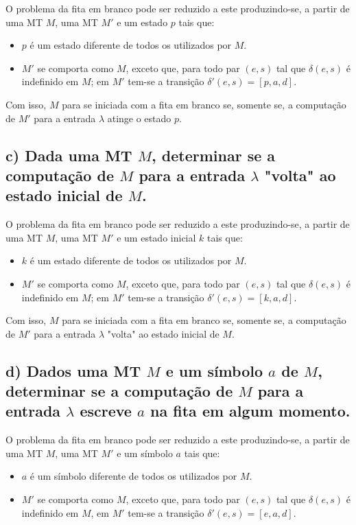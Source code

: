O problema da fita em branco pode ser reduzido a este produzindo-se, a partir de uma MT $M$, uma MT $M'$ e um estado $p$ tais que:

\begin{itemize}
    \item $p$ é um estado diferente de todos os utilizados por $M$.
    \item $M'$ se comporta como $M$, exceto que, para todo par $(e,s)$ tal que $\delta{(e,s)}$ é indefinido em $M$; em $M'$ tem-se a transição $\delta'{(e,s)} = [p,a,d]$. 
\end{itemize}

Com isso, $M$ para se iniciada com a fita em branco se, somente se, a computação de $M'$ para a entrada $\lambda$ atinge o estado $p$.

\subsection*{c) Dada uma MT $M$, determinar se a computação de $M$ para a entrada $\lambda$ "volta" ao estado inicial de $M$.}

O problema da fita em branco pode ser reduzido a este produzindo-se, a partir de uma MT $M$, uma MT $M'$ e um estado inicial $k$ tais que:

\begin{itemize}
    \item $k$ é um estado diferente de todos os utilizados por $M$.
    \item $M'$ se comporta como $M$, exceto que, para todo par $(e,s)$ tal que $\delta{(e,s)}$ é indefinido em $M$; em $M'$ tem-se a transição $\delta'{(e,s)} = [k,a,d]$. 
\end{itemize}

Com isso, $M$ para se iniciada com a fita em branco se, somente se, a computação de $M'$ para a entrada $\lambda$ "volta" ao estado inicial de $M$.

\subsection*{d) Dados uma MT $M$ e um símbolo $a$ de $M$, determinar se a computação de $M$ para a entrada $\lambda$ escreve $a$ na fita em algum momento.}

O problema da fita em branco pode ser reduzido a este produzindo-se, a partir de uma MT $M$, uma MT $M'$ e um símbolo $a$ tais que:

\begin{itemize}
    \item $a$ é um símbolo diferente de todos os utilizados por $M$.
    \item $M'$ se comporta como $M$, exceto que, para todo par $(e,s)$ tal que $\delta{(e,s)}$ é indefinido em $M$, em $M'$ tem-se a transição $\delta'{(e,s)} = [e,a,d]$. 
\end{itemize}

